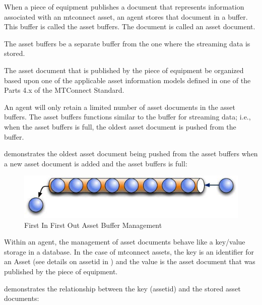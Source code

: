 When a piece of equipment publishes a document that represents information associated with an \gls{mtconnect asset}, an \gls{agent} stores that document in a \gls{buffer}.  This \gls{buffer} is called the \glspl{asset buffer}.  The document is called an \gls{asset document}.

The \glspl{asset buffer} \MUST be a separate \gls{buffer} from the one where the \gls{streaming data} is stored.

The \gls{asset document} that is published by the piece of equipment \MUST be organized based upon one of the applicable \glspl{asset information model} defined in one of the Parts 4.x of the MTConnect Standard.

An \gls{agent} will only retain a limited number of \glspl{asset document} in the \glspl{asset buffer}.  The \glspl{asset buffer} functions similar to the \gls{buffer} for \gls{streaming data}; i.e., when the \glspl{asset buffer} is full, the oldest \gls{asset document} is pushed from the \gls{buffer}.

 demonstrates the oldest \gls{asset document} being pushed from the \glspl{asset buffer} when a new \gls{asset document} is added and the \glspl{asset buffer} is full:

\begin{figure}[ht]
  \centering
  \includegraphics[width=1.0\textwidth]{figures/first-in-first-out-asset-buffer-management.png}
  \caption{First In First Out Asset Buffer Management}
  \label{fig:first-in-first-out-asset-buffer-management}
\end{figure}

\FloatBarrier

Within an \gls{agent}, the management of \glspl{asset document} behave like a key/value storage in a database.  In the case of \glspl{mtconnect asset}, the key is an identifier for an Asset (see details on \gls{assetid} in ) and the value is the \gls{asset document} that was published by the piece of equipment. 

 demonstrates the relationship between the key (\gls{assetid}) and the stored \glspl{asset document}:

